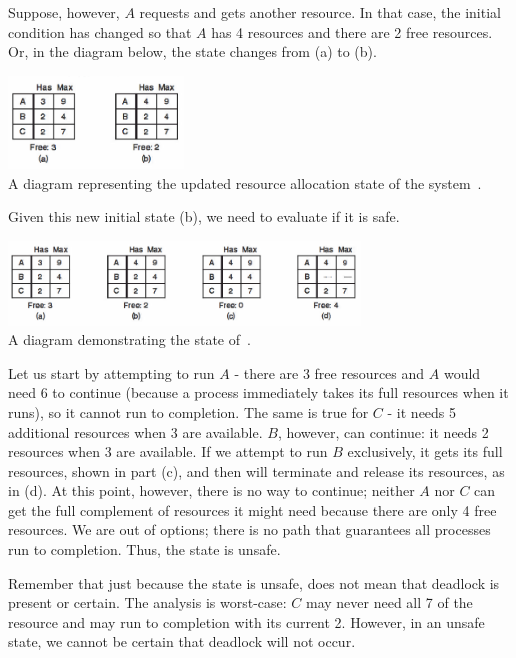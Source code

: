 Suppose, however, $A$ requests and gets another resource. In that case, the initial condition has changed so that $A$ has 4 resources and there are 2 free resources. Or, in the diagram below, the state changes from (a) to (b).

\begin{center}
\includegraphics[width=0.35\textwidth]{images/unsafe-state-initial.png}\\
A diagram representing the updated resource allocation state of the system~\cite{mos}.
\end{center}

Given this new initial state (b), we need to evaluate if it is safe. 

\begin{center}
\includegraphics[width=0.70\textwidth]{images/unsafe-state.png}\\
A diagram demonstrating the state of~\cite{mos}.
\end{center}

Let us start by attempting to run $A$ - there are 3 free resources and $A$ would need 6 to continue (because a process immediately takes its full resources when it runs), so it cannot run to completion. The same is true for $C$ - it needs 5 additional resources when 3 are available. $B$, however, can continue: it needs 2 resources when 3 are available. If we attempt to run $B$ exclusively, it gets its full resources, shown in part (c), and then will terminate and release its resources, as in (d). At this point, however, there is no way to continue; neither $A$ nor $C$ can get the full complement of resources it might need because there are only 4 free resources. We are out of options; there is no path that guarantees all processes run to completion. Thus, the state is unsafe. 

Remember that just because the state is unsafe, does not mean that deadlock is present or certain. The analysis is worst-case: $C$ may never need all 7 of the resource and may run to completion with its current 2. However, in an unsafe state, we cannot be certain that deadlock will not occur.


